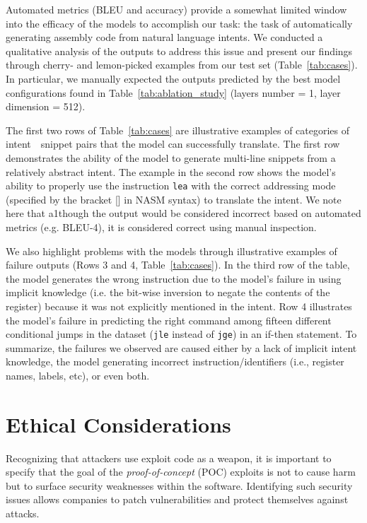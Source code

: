 \documentclass[11pt,a4paper]{article}
\begin{document}
Automated metrics (BLEU and accuracy) provide a somewhat limited window into the efficacy of the models to accomplish our task: the task of automatically generating assembly code from natural language intents. We conducted a qualitative analysis of the outputs to address this issue and present our findings through cherry- and lemon-picked examples from our test set (Table~\ref{tab:cases}). In particular, we manually expected the outputs predicted by the best model configurations found in Table~\ref{tab:ablation_study} (layers number = 1, layer dimension = 512).



The first two rows of Table~\ref{tab:cases} are illustrative examples of categories of  intent~\textendash~snippet pairs that the model can successfully translate. 
The first row demonstrates the ability of the model to generate multi-line snippets from a relatively abstract intent. 
The example in the second row shows the model's ability to properly use the instruction \texttt{lea} with the correct addressing mode (specified by the bracket [] in NASM syntax) to translate the intent. We note here that a1though the output would be considered incorrect based on automated metrics (e.g.  BLEU-4), it is considered correct using manual inspection.

We also highlight problems with the models through illustrative examples of failure outputs (Rows 3 and 4, Table~\ref{tab:cases}).
In the third row of the table, the model generates the wrong instruction due to the model's failure in using implicit knowledge (i.e. the bit-wise inversion to negate the contents of the register) because it was not explicitly mentioned in the intent. 
Row 4 illustrates the model's failure in predicting the right command among fifteen different conditional jumps in the dataset (\texttt{jle} instead of \texttt{jge}) in an if-then statement.  
To summarize, the failures we observed are caused either by a lack of implicit intent knowledge, the model generating incorrect instruction/identifiers (i.e., register names, labels, etc), or even both.



 
\section{Ethical Considerations}
\label{sec:ethics}
Recognizing that attackers use exploit code as a weapon, it is important to specify that the goal of the \textit{proof-of-concept} (POC) exploits is not to cause harm but to surface security weaknesses within the software. Identifying such security issues allows companies to patch vulnerabilities and protect themselves against attacks. 
\end{document}
